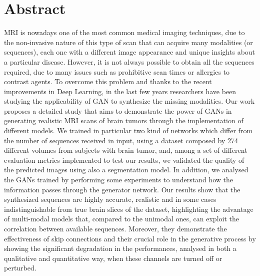 \chapter*{Abstract}
\label{cha:abstract}
\onehalfspace
\ac{MRI} is nowadays one of the most common medical imaging techniques, due to the non-invasive nature of this type of scan that can acquire many modalities (or sequences), each one with a different image appearance and unique insights about a particular disease. However, it is not always possible to obtain all the sequences required, due to many issues such as prohibitive scan times or allergies to contrast agents. To overcome this problem and thanks to the recent improvements in Deep Learning, in the last few years researchers have been studying the applicability of \ac{GAN} to synthesize the missing modalities. Our work proposes a detailed study that aims to demonstrate the power of GANs in generating realistic \ac{MRI} scans of brain tumors through the implementation of different models.  We trained in particular two kind of networks which differ from the number of sequences received in input, using a dataset composed by 274 different volumes from subjects with brain tumor, and, among a set of different evaluation metrics implemented to test our results, we validated the quality of the predicted images using also a segmentation model.
In addition, we analysed the \ac{GAN}s trained by performing some experiments to understand how the information passes through the generator network. Our results show that the synthesized sequences are highly accurate, realistic and in some cases indistinguishable from true brain slices of the dataset, highlighting the advantage of multi-modal models that, compared to the unimodal ones, can exploit the correlation between available sequences. Moreover, they demonstrate the effectiveness of skip connections and their crucial role in the generative process by showing the significant degradation in the performances, analysed in both a qualitative and quantitative way, when these channels are turned off or perturbed.